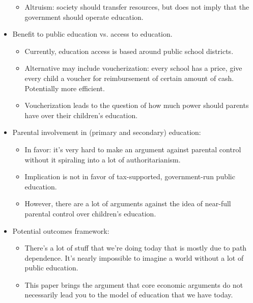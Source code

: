 \documentclass[10pt]{extarticle}
\begin{document}
\begin{itemize}
\begin{itemize}
        \item Altruism: society should transfer resources, but does not imply that the government should operate education.
      \end{itemize}
    \item Benefit to public education vs. access to education.
      \begin{itemize}
        \item Currently, education access is based around public school districts.
        \item Alternative may include voucherization: every school has a price, give every child a voucher for reimbursement of certain amount of cash. Potentially more efficient.
        \item Voucherization leads to the question of how much power should parents have over their children's education.
      \end{itemize}
    \item Parental involvement in (primary and secondary) education:
      \begin{itemize}
        \item In favor: it's very hard to make an argument against parental control without it spiraling into a lot of authoritarianism.
        \item Implication is not in favor of tax-supported, government-run public education.
        \item However, there are a lot of arguments against the idea of near-full parental control over children's education.
      \end{itemize}
    \item Potential outcomes framework:
      \begin{itemize}
        \item There's a lot of stuff that we're doing today that is mostly due to path dependence. It's nearly impossible to imagine a world without a lot of public education.
        \item This paper brings the argument that core economic arguments do not necessarily lead you to the model of education that we have today.
      \end{itemize}
  \end{itemize}
\end{document}
